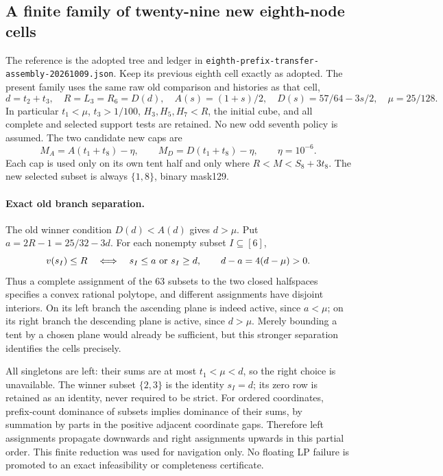 \subsection{A finite family of twenty-nine new eighth-node cells}

The reference is the adopted tree and ledger in
\texttt{eighth-prefix-transfer-assembly-20261009.json}. Keep its previous
eighth cell exactly as adopted. The present family uses the same raw old
comparison and histories as that cell,
\[
 d=t_2+t_3,\quad R=L_3=R_6=D(d),\quad
 A(s)=(1+s)/2,\quad D(s)=57/64-3s/2,\quad\mu=25/128.
\]
In particular $t_1<\mu$, $t_3>1/100$, $H_3,H_5,H_7<R$, the initial
cube, and all complete and selected support tests are retained. No new
odd seventh policy is assumed. The two candidate new caps are
\[
 M_A=A(t_1+t_8)-\eta,\qquad M_D=D(t_1+t_8)-\eta,
 \qquad\eta=10^{-6}.
\]
Each cap is used only on its own tent half and only where $R<M<S_8+3t_8$.
The new selected subset is always $\{1,8\}$, binary mask129.

\paragraph{Exact old branch separation.}
The old winner condition $D(d)<A(d)$ gives $d>\mu$. Put
$a=2R-1=25/32-3d$. For each nonempty subset $I\subseteq[6]$,
\[
 v(s_I)\le R\quad\Longleftrightarrow\quad
 s_I\le a\ \hbox{or}\ s_I\ge d,
 \qquad d-a=4(d-\mu)>0.
\]
Thus a complete assignment of the 63 subsets to the two closed halfspaces
specifies a convex rational polytope, and different assignments have
disjoint interiors. On its left branch the ascending plane is indeed
active, since $a<\mu$; on its right branch the descending plane is active,
since $d>\mu$. Merely bounding a tent by a chosen plane would already be
sufficient, but this stronger separation identifies the cells precisely.

All singletons are left: their sums are at most $t_1<\mu<d$, so the right
choice is unavailable. The winner subset $\{2,3\}$ is the identity $s_I=d$;
its zero row is retained as an identity, never required to be strict.
For ordered coordinates, prefix-count dominance of subsets implies
dominance of their sums, by summation by parts in the positive adjacent
coordinate gaps. Therefore left assignments propagate downwards and
right assignments upwards in this partial order. This finite reduction
was used for navigation only. No floating LP failure is promoted to an
exact infeasibility or completeness certificate.

